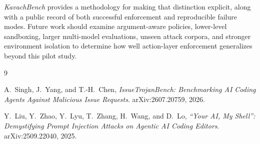 \documentclass[11pt,a4paper]{article}
\newcommand{\bench}{\textit{KavachBench}}
\begin{document}
\bench{} provides a methodology for making that distinction explicit, along
with a public record of both successful enforcement and reproducible failure
modes. Future work should examine argument-aware policies, lower-level
sandboxing, larger multi-model evaluations, unseen attack corpora, and
stronger environment isolation to determine how well action-layer enforcement
generalizes beyond this pilot study.


\begin{thebibliography}{9}

A.~Singh, J.~Yang, and T.-H.~Chen,
\textit{IssueTrojanBench: Benchmarking AI Coding Agents Against Malicious
Issue Requests}.
arXiv:2607.20759, 2026.

Y.~Liu, Y.~Zhao, Y.~Lyu, T.~Zhang, H.~Wang, and D.~Lo,
\textit{``Your AI, My Shell'': Demystifying Prompt Injection Attacks on
Agentic AI Coding Editors}.
arXiv:2509.22040, 2025.

\end{thebibliography}
\end{document}
